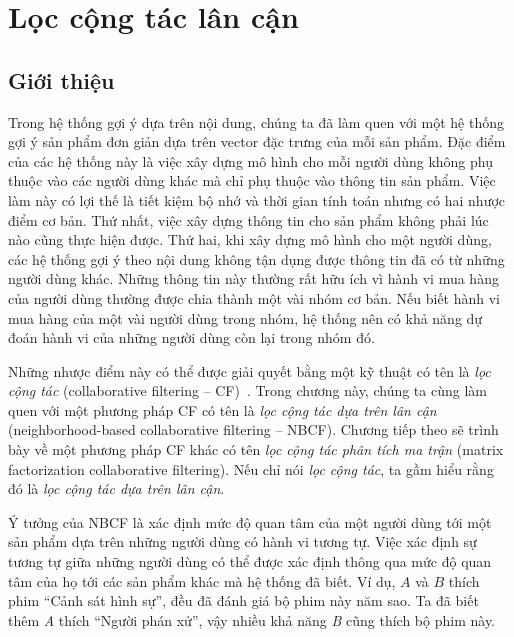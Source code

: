 \chapter{Lọc cộng tác lân cận}
\label{cha:CF}
 
\section{Giới thiệu}

 
Trong hệ thống gợi ý dựa trên nội dung, chúng ta đã làm quen với một hệ thống
gợi ý sản phẩm đơn giản dựa trên vector đặc trưng của mỗi sản phẩm. Đặc điểm của
các hệ thống này là việc xây dựng mô hình cho mỗi người dùng không phụ thuộc vào
các người dùng khác mà chỉ phụ thuộc vào thông tin sản phẩm. Việc làm này có lợi
thế là tiết kiệm bộ nhớ và thời gian tính toán nhưng có hai nhược điểm cơ bản.
Thứ nhất, việc xây dựng thông tin cho sản phẩm không phải lúc nào cũng thực hiện
được. Thứ hai, khi xây dựng mô hình cho một người dùng, các hệ thống gợi ý theo
nội dung không tận dụng được thông tin đã có từ những người dùng khác. Những
thông tin này thường rất hữu ích vì hành vi mua hàng của người dùng thường được
chia thành một vài nhóm cơ bản. Nếu biết hành vi mua hàng của một vài người dùng
trong nhóm, hệ thống nên có khả năng dự đoán hành vi của những người dùng còn
lại trong nhóm đó.
 
Những nhược điểm này có thể được giải quyết bằng một kỹ thuật có tên là \textit{lọc cộng tác} (collaborative filtering -- CF)~\cite{schafer2007collaborative,
ekstrand2011collaborative}. Trong chương này, chúng ta cùng làm quen với một
phương pháp CF có tên là \textit{lọc cộng tác dựa trên lân cận} (neighborhood-based collaborative filtering -- NBCF). Chương tiếp theo sẽ trình bày về một phương pháp CF khác có tên \textit{lọc cộng tác phân tích ma trận}
(matrix factorization collaborative filtering). Nếu chỉ nói
\textit{lọc cộng tác}, ta gầm hiểu rằng đó là
\textit{lọc cộng tác dựa trên lân cận}.
 
Ý tưởng của NBCF là xác định {mức độ quan tâm} của một người dùng tới một sản
phẩm dựa trên những người dùng có hành vi tương tự. Việc xác định sự tương tự
giữa những người dùng có thể được xác định thông qua {mức độ quan tâm} của họ
tới các sản phẩm khác mà hệ thống đã biết.  Ví dụ, $A$ và $B$ thích phim
``{Cảnh sát hình sự}'', đều đã đánh giá bộ phim này năm sao. Ta đã biết thêm
\textit{A} thích ``{Người phán xử}'', vậy nhiều khả năng \textit{B} cũng
thích bộ phim này.
 
